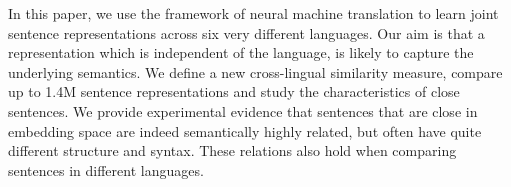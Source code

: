 In this paper, we use the framework of neural machine translation to learn joint sentence representations across six very different languages. Our aim is that a representation which is independent of the language, is likely to capture the underlying semantics.  We define a new cross-lingual similarity measure, compare up to 1.4M sentence representations and study the characteristics of close sentences. We provide experimental evidence that sentences that are close in embedding space are indeed semantically highly related, but often have quite different structure and syntax.  These relations also hold when comparing sentences in different languages.
